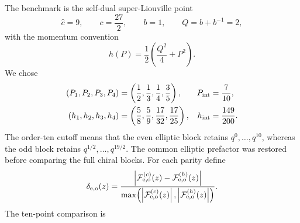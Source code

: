 \documentclass[11pt]{article}
\newcommand{\F}{\mathcal F}
\begin{document}
The benchmark is the self-dual super-Liouville point
\begin{equation}
 \widehat c=9,\qquad c=\frac{27}{2},\qquad b=1,\qquad Q=b+b^{-1}=2,
 \label{eq:sphere-order-ten-central-charge}
\end{equation}
with the momentum convention
\begin{equation}
 h(P)=\frac12\left(\frac{Q^2}{4}+P^2\right).
 \label{eq:sphere-liouville-weight-convention}
\end{equation}
We chose
\begin{align}
 (P_1,P_2,P_3,P_4)
 &=\left(\frac12,\frac13,\frac14,\frac35\right),
 &P_{\rm int}&=\frac7{10},\nonumber\\
 (h_1,h_2,h_3,h_4)
 &=\left(\frac58,\frac59,\frac{17}{32},\frac{17}{25}\right),
 &h_{\rm int}&=\frac{149}{200}.
 \label{eq:sphere-order-ten-benchmark}
\end{align}
The order-ten cutoff means that the even elliptic block retains
\(q^0,\ldots,q^{10}\), whereas the odd block retains
\(q^{1/2},\ldots,q^{19/2}\).  The common elliptic prefactor was restored
before comparing the full chiral blocks.  For each parity define
\begin{equation}
 \delta_{\rm e,o}(z)
 =\frac{\left|\F_{\rm e,o}^{(c)}(z)
                  -\F_{\rm e,o}^{(h)}(z)\right|}
        {\max\!\left(\left|\F_{\rm e,o}^{(c)}(z)\right|,
                     \left|\F_{\rm e,o}^{(h)}(z)\right|\right)}.
 \label{eq:sphere-c-h-relative-error}
\end{equation}
The ten-point comparison is
\end{document}
